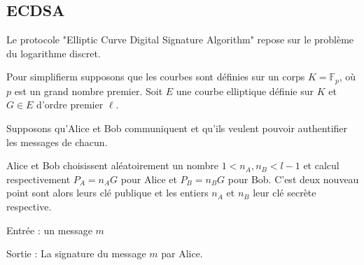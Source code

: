 


    



\subsection{ECDSA}

Le protocole "Elliptic Curve Digital Signature Algorithm" repose sur le problème du logarithme
discret. 

Pour simplifierm supposons que les courbes sont définies sur un corps $K = \mathbb{F}_{p}$, où
$p$ est un grand nombre premier. Soit $E$ une courbe elliptique définie sur $K$ et $G \in E$
d'ordre premier $\ell$. 

Supposons qu'Alice et Bob communiquent et qu'ils veulent pouvoir authentifier les messages de
chacun.

Alice et Bob choisissent aléatoirement un nombre $1 < n_{A}, n_{B} < l-1$ et calcul
respectivement $P_{A} = n_{A}G$ pour Alice et $P_{B} = n_{B}G$ pour Bob. C'est deux nouveau
point sont alors leurs clé publique et les entiers $n_{A}$ et $n_{B}$ leur clé secrète
respective.


    Entrée : un message $m$ 

    Sortie : La signature du message $m$ par Alice.

